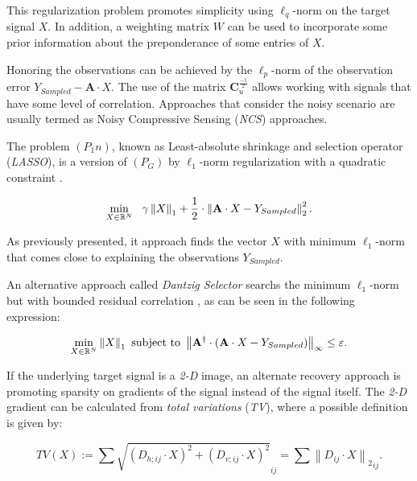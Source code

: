 This regularization problem promotes simplicity using $\ell_q$-norm on the target signal $X$. In addition, a weighting matrix $W$ can be used to incorporate some prior information about the preponderance of some entries of $X$. 

Honoring the observations can be achieved by the $\ell_p$-norm of the observation error $Y_{Sampled} - \textbf{A}\cdot X$. The use of the matrix $\textbf{C}_{u}^{\frac{-1}{2}}$ allows working with signals that have some level of correlation. Approaches that consider the noisy scenario are usually termed as Noisy Compressive Sensing (\emph{NCS}) approaches.

The problem $(P_1n)$, known as Least-absolute shrinkage and selection operator (\emph{LASSO}), is a version of $(P_G)$ by $\ell_1$-norm regularization with a quadratic constraint \citep{Boyko_2011_a}.

\begin{equation}
\min_{X \in \mathbb{R}^{N}} \ \  \gamma \left\| X \right\| _{1}  + \frac{1}{2} \cdot \left\| \textbf{A} \cdot X - Y_{Sampled} \right\| _{2}^{2} .
\label{eq:BPDN_reg}
\end{equation}

As previously presented, it approach finds the vector $X$ with minimum $\ell_1$-norm that comes close to explaining the observations $Y_{Sampled}$.

An alternative approach called \emph{Dantzig Selector} searchs the minimum $\ell_1$-norm but with bounded residual correlation \citep{Candes_2007_a}, as can be seen in the following expression:

\begin{equation}
\min_{X \in \mathbb{R}^{N}} \left\| X \right\| _{1} \mbox{ subject to }  \left\| \mathbf{A}^\dagger \cdot (\mathbf{A} \cdot X - Y_{Sampled}) \right\| _{\infty} \leq \varepsilon .
\label{eq:Dantzig_reg}
\end{equation}


If the underlying target signal is a \emph{2-D} image, an alternate recovery approach is promoting sparsity on gradients of the signal instead of the signal itself. The \emph{2-D} gradient can be calculated from \emph{total variations} (\emph{TV}), where a possible definition is given by:

\begin{equation}
TV(X) := \sum{\sqrt{(D_{h;ij} \cdot X)^2+(D_{v;ij} \cdot X)^2}}_{ij} = \sum{\left\| D_{ij} \cdot X \right\| _{2}}_{ij} .
\label{eq:TV_reg}
\end{equation}

